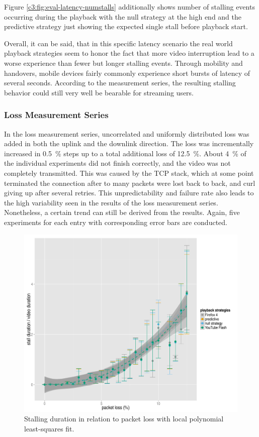 Figure \ref{c3:fig:eval-latency-numstalls} additionally shows number of stalling events occurring during the playback with the null strategy at the high end and the predictive strategy just showing the expected single stall before playback start.

Overall, it can be said, that in this specific latency scenario the real world playback strategies seem to honor the fact that more video interruption lead to a worse experience than fewer but longer stalling events. Through mobility and handovers, mobile devices fairly commonly experience short bursts of latency of several seconds. According to the measurement series, the resulting stalling behavior could still very well be bearable for streaming users.


\subsubsection{Loss Measurement Series}

In the loss measurement series, uncorrelated and uniformly distributed loss was added in both the uplink and the downlink direction. The loss was incrementally increased in \SI{0.5}{\percent} steps up to a total additional loss of \SI{12.5}{\percent}. About \SI{4}{\percent} of the individual experiments did not finish correctly, and the video was not completely transmitted. This was caused by the \gls{TCP} stack, which at some point terminated the connection after to many packets were lost back to back, and curl giving up after several retries. This unpredictability and failure rate also leads to the high variability seen in the results of the loss measurement series. Nonetheless, a certain trend can still be derived from the results. Again, five experiments for each entry with corresponding error bars are conducted.


\begin{figure}[htbp]
	\centering
	\includegraphics[width=1.0\textwidth]{images/R-playbackemulation-stallduration-loss.pdf}
	\caption{Stalling duration in relation to packet loss with local polynomial least-squares fit.}
\label{c3:fig:eval-loss-stallingtime}
\end{figure}

